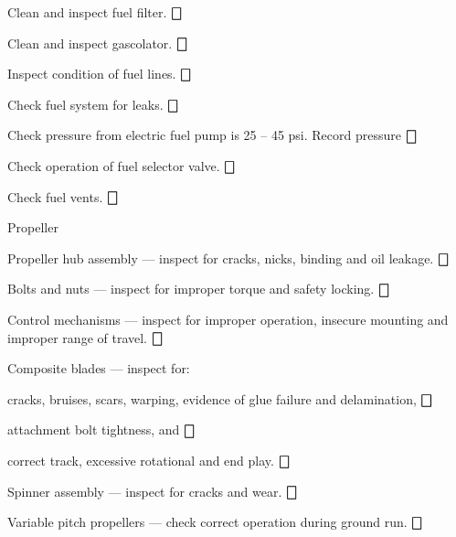 \begin{enumerate*}
\begin{enumerate*}
		\item Clean and inspect fuel filter. \dotfill $\bigbox$
		\item Clean and inspect gascolator. \dotfill $\bigbox$
		\item Inspect condition of fuel lines. \dotfill $\bigbox$
		\item Check fuel system for leaks. \dotfill $\bigbox$
		\item Check pressure from electric fuel pump is 25 -- 45 psi. Record pressure \dotfill $\bigbox$
		\item Check operation of fuel selector valve. \dotfill $\bigbox$
		\item Check fuel vents. \dotfill $\bigbox$
	\end{enumerate*}

	\item{Propeller} 
	\begin{enumerate*}
	  \item Propeller hub assembly --- inspect for cracks, nicks, binding and oil leakage. \dotfill $\bigbox$
	  \item Bolts and nuts --- inspect for improper torque and safety locking. \dotfill $\bigbox$
	  \item Control mechanisms --- inspect for improper operation, insecure mounting and improper range of travel. \dotfill $\bigbox$
	  \item Composite blades --- inspect for:
	  \begin{enumerate*}
	    \item cracks, bruises, scars, warping, evidence of glue failure and delamination, \dotfill $\bigbox$
	    \item attachment bolt tightness, and \dotfill $\bigbox$
	    \item correct track, excessive rotational and end play. \dotfill $\bigbox$

  	  \end{enumerate*}
  	\item Spinner assembly --- inspect for cracks and wear. \dotfill $\bigbox$
  	\item Variable pitch propellers --- check correct operation during ground run. \dotfill $\bigbox$
	\end{enumerate*}



\end{enumerate*}
